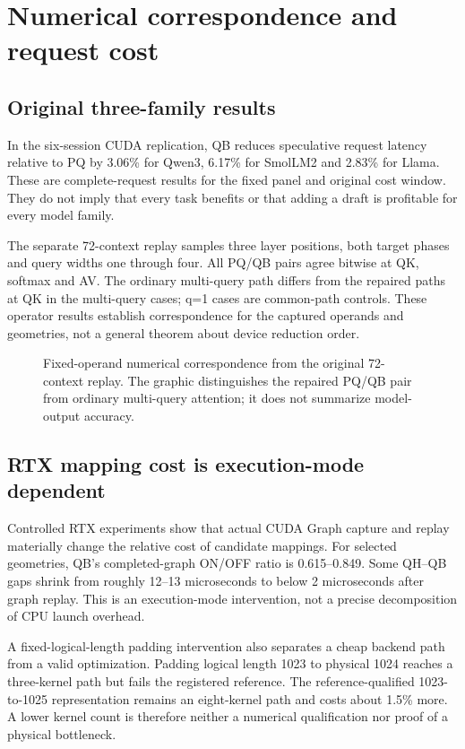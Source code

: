 \section{Numerical correspondence and request cost}
\label{sec:results}
\subsection{Original three-family results}
In the six-session CUDA replication, QB reduces speculative request latency relative to PQ by 3.06\% for Qwen3, 6.17\% for SmolLM2 and 2.83\% for Llama. These are complete-request results for the fixed panel and original cost window. They do not imply that every task benefits or that adding a draft is profitable for every model family.

The separate 72-context replay samples three layer positions, both target phases and query widths one through four. All PQ/QB pairs agree bitwise at QK, softmax and AV. The ordinary multi-query path differs from the repaired paths at QK in the multi-query cases; q=1 cases are common-path controls. These operator results establish correspondence for the captured operands and geometries, not a general theorem about device reduction order.

\begin{figure}[t]
\centering

\caption{Fixed-operand numerical correspondence from the original 72-context replay. The graphic distinguishes the repaired PQ/QB pair from ordinary multi-query attention; it does not summarize model-output accuracy.}
\label{fig:numeric}
\end{figure}

\subsection{RTX mapping cost is execution-mode dependent}
Controlled RTX experiments show that actual CUDA Graph capture and replay materially change the relative cost of candidate mappings. For selected geometries, QB's completed-graph ON/OFF ratio is 0.615--0.849. Some QH--QB gaps shrink from roughly 12--13 microseconds to below 2 microseconds after graph replay. This is an execution-mode intervention, not a precise decomposition of CPU launch overhead.

A fixed-logical-length padding intervention also separates a cheap backend path from a valid optimization. Padding logical length 1023 to physical 1024 reaches a three-kernel path but fails the registered reference. The reference-qualified 1023-to-1025 representation remains an eight-kernel path and costs about 1.5\% more. A lower kernel count is therefore neither a numerical qualification nor proof of a physical bottleneck.

